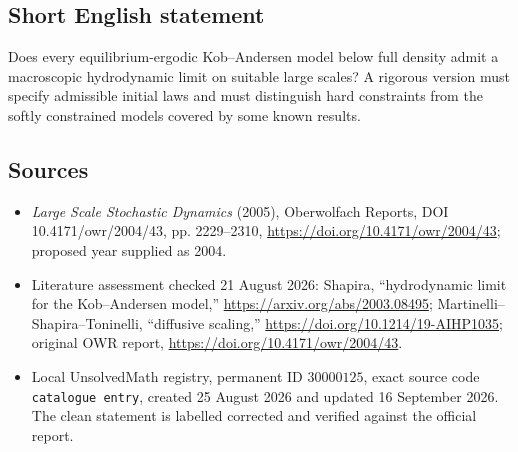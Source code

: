 \documentclass[11pt]{article}
\begin{document}
\subsection{Short English statement}
Does every equilibrium-ergodic Kob--Andersen model below full density admit a macroscopic hydrodynamic limit on suitable large scales? A rigorous version must specify admissible initial laws and must distinguish hard constraints from the softly constrained models covered by some known results.
\subsection{Sources}
\begin{itemize}
\item \emph{Large Scale Stochastic Dynamics} (2005), Oberwolfach Reports, DOI 10.4171/owr/2004/43, pp. 2229--2310, \url{https://doi.org/10.4171/owr/2004/43}; proposed year supplied as 2004.
\item Literature assessment checked 21 August 2026: Shapira, ``hydrodynamic limit for the Kob--Andersen model,'' \url{https://arxiv.org/abs/2003.08495}; Martinelli--Shapira--Toninelli, ``diffusive scaling,'' \url{https://doi.org/10.1214/19-AIHP1035}; original OWR report, \url{https://doi.org/10.4171/owr/2004/43}.
\item Local UnsolvedMath registry, permanent ID $30000125$, exact source code \texttt{catalogue entry}, created 25 August 2026 and updated 16 September 2026. The clean statement is labelled corrected and verified against the official report.
\end{itemize}
\end{document}
